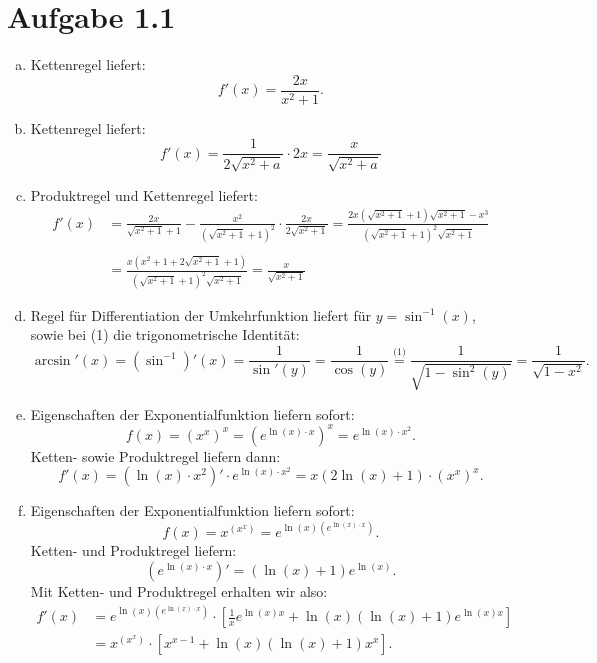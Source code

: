 \documentclass{theozettel}
\begin{document}

\section*{Aufgabe 1.1}
\begin{enumerate}[(a)]
	\item 	Kettenregel liefert:
			\[
				f'(x) = \frac{2x}{x^{2}+1}.
			\]
	
	\item 	Kettenregel liefert:
			\[
				f'(x) = \frac{1}{2\sqrt{x^{2}+a}}\cdot 2x = \frac{x}{\sqrt{x^{2}+a}}
			\]
	
	\item 	Produktregel und Kettenregel liefert:
			\begin{align*}
				f'(x) &= \frac{2x}{\sqrt{x^{2}+1}+1} - \frac{x^{2}}{(\sqrt{x^{2}+1}+1)^{2}}\cdot \frac{2x}{2\sqrt{x^{2}+1}} = \frac{2x(\sqrt{x^2 + 1}+1)\sqrt{x^2 +1} - x^3}{(\sqrt{x^{2}+1}+1)^{2}\sqrt{x^{2}+1}} \\ & \\
				&= \frac{x(x^2 +1 + 2\sqrt{x^2 +1} + 1)}{(\sqrt{x^{2}+1}+1)^{2}\sqrt{x^{2}+1}} = \frac{x}{\sqrt{x^{2}+1}}
			\end{align*}
			
	\item 	Regel für Differentiation der Umkehrfunktion liefert für $y = \sin^{-1}(x)$, sowie bei (1) die trigonometrische Identität:
			\[
				\arcsin'(x) = (\sin^{-1})'(x) = \frac{1}{\sin'(y)} = \frac{1}{\cos(y)} \stackrel{\text{(1)}}{=} \frac{1}{\sqrt{1 - \sin^{2}(y)}} = \frac{1}{\sqrt{1-x^{2}}}.
			\]
	
	\item 	Eigenschaften der Exponentialfunktion liefern sofort:
			\[
				f(x) = \left(x^{x}\right)^{x} = \left(e^{\ln(x) \cdot x} \right)^{x} = e^{\ln(x) \cdot x^{2}}.
			\]
			Ketten- sowie Produktregel liefern dann:
			\[
				f'(x) = \left(\ln(x) \cdot x^{2}\right)' \cdot e^{\ln(x) \cdot x^{2}} = x(2\ln(x) + 1)\cdot \left(x^{x}\right)^{x}.
			\]
	
	\item 	Eigenschaften der Exponentialfunktion liefern sofort:
			\[
				f(x) = x^{\left( x^{x} \right)} = e^{\ln(x) \left(e^{\ln(x) \cdot x}\right)}.
			\]
			Ketten- und Produktregel liefern:
			\[
				\left(e^{\ln(x) \cdot x}\right)' = (\ln(x) +1)e^{\ln(x)}.
			\]
			Mit Ketten- und Produktregel erhalten wir also:
			\begin{align*}
				f'(x) &= e^{\ln(x) \left(e^{\ln(x) \cdot x}\right)} \cdot \left[ \frac{1}{x}e^{\ln(x)x} + \ln(x)\left(\ln(x) + 1\right)e^{\ln(x)x} \right] \\ &= x^{\left( x^{x} \right)} \cdot \left[x^{x-1} + \ln(x)(\ln(x) +1)x^{x} \right].
			\end{align*}
\end{enumerate}
\end{document}
